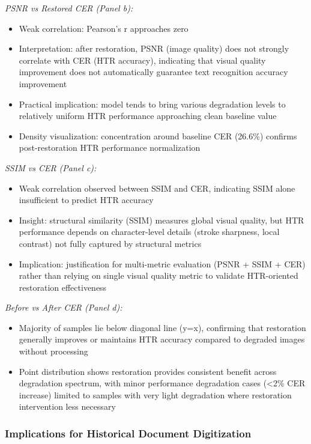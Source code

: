\documentclass[journal]{IEEEtran}
\begin{document}
\textit{PSNR vs Restored CER (Panel b):}
\begin{itemize}
    \item Weak correlation: Pearson's r approaches zero
    \item Interpretation: after restoration, PSNR (image quality) does not strongly correlate with CER (HTR accuracy), indicating that visual quality improvement does not automatically guarantee text recognition accuracy improvement
    \item Practical implication: model tends to bring various degradation levels to relatively uniform HTR performance approaching clean baseline value
    \item Density visualization: concentration around baseline CER (26.6\%) confirms post-restoration HTR performance normalization
\end{itemize}

\textit{SSIM vs CER (Panel c):}
\begin{itemize}
    \item Weak correlation observed between SSIM and CER, indicating SSIM alone insufficient to predict HTR accuracy
    \item Insight: structural similarity (SSIM) measures global visual quality, but HTR performance depends on character-level details (stroke sharpness, local contrast) not fully captured by structural metrics
    \item Implication: justification for multi-metric evaluation (PSNR + SSIM + CER) rather than relying on single visual quality metric to validate HTR-oriented restoration effectiveness
\end{itemize}

\textit{Before vs After CER (Panel d):}
\begin{itemize}
    \item Majority of samples lie below diagonal line (y=x), confirming that restoration generally improves or maintains HTR accuracy compared to degraded images without processing
    \item Point distribution shows restoration provides consistent benefit across degradation spectrum, with minor performance degradation cases (<2\% CER increase) limited to samples with very light degradation where restoration intervention less necessary
\end{itemize}

\subsubsection{Implications for Historical Document Digitization}
\end{document}
